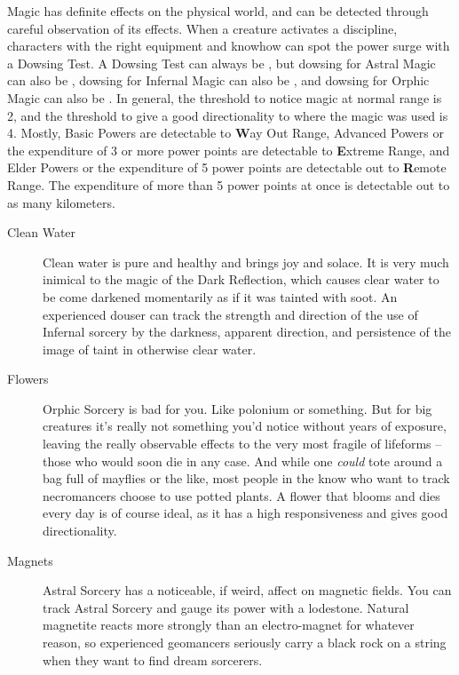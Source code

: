 \hspace{\parindent} Magic has definite effects on the physical world, and can be detected through careful observation of its effects. When a creature activates a discipline, characters with the right equipment and knowhow can spot the power surge with a Dowsing Test. A Dowsing Test can always be , but dowsing for Astral Magic can also be , dowsing for Infernal Magic can also be , and dowsing for Orphic Magic can also be . In general, the threshold to notice magic at normal range is 2, and the threshold to give a good directionality to where the magic was used is 4. Mostly, Basic Powers are detectable to \textbf{W}ay Out Range, Advanced Powers or the expenditure of 3 or more power points are detectable to \textbf{E}xtreme Range, and Elder Powers or the expenditure of 5 power points are detectable out to \textbf{R}emote Range. The expenditure of more than 5 power points at once is detectable out to as many kilometers.

\begin{description}
\item[Clean Water] Clean water is pure and healthy and brings joy and solace. It is very much inimical to the magic of the Dark Reflection, which causes clear water to be come darkened momentarily as if it was tainted with soot. An experienced douser can track the strength and direction of the use of Infernal sorcery by the darkness, apparent direction, and persistence of the image of taint in otherwise clear water.

\item[Flowers] Orphic Sorcery is bad for you. Like polonium or something. But for big creatures it's really not something you'd notice without years of exposure, leaving the really observable effects to the very most fragile of lifeforms -- those who would soon die in any case. And while one \textit{could} tote around a bag full of mayflies or the like, most people in the know who want to track necromancers choose to use potted plants. A flower that blooms and dies every day is of course ideal, as it has a high responsiveness and gives good directionality.

\item[Magnets] Astral Sorcery has a noticeable, if weird, affect on magnetic fields. You can track Astral Sorcery and gauge its power with a lodestone. Natural magnetite reacts more strongly than an electro-magnet for whatever reason, so experienced geomancers seriously carry a black rock on a string when they want to find dream sorcerers.
\end{description}

